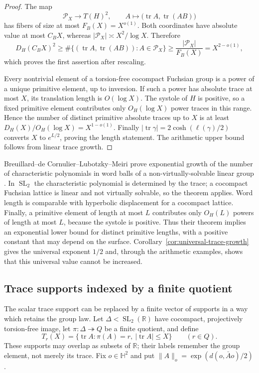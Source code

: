 \documentclass[11pt,reqno]{amsart}
\theoremstyle{definition}
\theoremstyle{remark}
\newcommand{\R}{\mathbb R}
\newcommand{\Tr}{\operatorname{tr}}
\newcommand{\SL}{\operatorname{SL}}
\begin{document}
\begin{proof}
The map
\[
 \mathcal P_X\longrightarrow T(H)^2,
 \qquad A\longmapsto\bigl(\Tr A,\Tr(AB)\bigr)
\]
has fibers of size at most \(F_B(X)=X^{o(1)}\).  Both coordinates have
absolute value at most \(C_BX\), whereas
\(|\mathcal P_X|\asymp X^2/\log X\).  Therefore
\[
 D_H(C_BX)^2\ge
 \#\{(\Tr A,\Tr(AB)):A\in\mathcal P_X\}
 \ge \frac{|\mathcal P_X|}{F_B(X)}=X^{2-o(1)},
\]
which proves the first assertion after rescaling.

Every nontrivial element of a torsion-free cocompact Fuchsian group is a
power of a unique primitive element, up to inversion.  If such a power has
absolute trace at most \(X\), its translation length is \(O(\log X)\).
The systole of \(H\) is positive, so a fixed primitive element contributes
only \(O_H(\log X)\) power traces in this range.  Hence the number of
distinct primitive absolute traces up to \(X\) is at least
\(D_H(X)/O_H(\log X)=X^{1-o(1)}\).  Finally
\(|\Tr\gamma|=2\cosh(\ell(\gamma)/2)\) converts \(X\) to
\(e^{L/2}\), proving the length statement.  The arithmetic upper bound
follows from linear trace growth.
\end{proof}

Breuillard--de Cornulier--Lubotzky--Meiri prove exponential growth of the
number of characteristic polynomials in word balls of a non-virtually-solvable
linear group \cite[Theorem~1.2]{BCLM}.  In \(\SL_2\) the characteristic
polynomial is determined by the trace; a cocompact Fuchsian lattice is
linear and not virtually solvable, so the theorem applies.  Word length is comparable with
hyperbolic displacement for a cocompact lattice.  Finally, a primitive
element of length at most \(L\) contributes only \(O_H(L)\) powers of length
at most \(L\), because the systole is positive.  Thus their theorem implies
an exponential lower bound for distinct primitive lengths, with a positive
constant that may depend on the surface.  Corollary~\ref{cor:universal-trace-growth} gives the
universal exponent \(1/2\) and, through the arithmetic examples, shows that
this universal value cannot be increased.

\subsection{Trace supports indexed by a finite quotient}

The scalar trace support can be replaced by a finite vector of supports in a
way which retains the group law.  Let \(\Delta<\SL_2(\R)\) have cocompact,
projectively torsion-free image, let
\(\pi:\Delta\twoheadrightarrow Q\) be a finite quotient, and define
\[
 T_r(X)=\{\Tr A:\pi(A)=r,\ |\Tr A|\le X\}\qquad(r\in Q).
\]
These supports may overlap as subsets of \(\R\); their labels remember the
group element, not merely its trace.  Fix \(o\in\mathbb H^2\) and put
\(\|A\|_o=\exp(d(o,\bar A o)/2)\).
\end{document}
